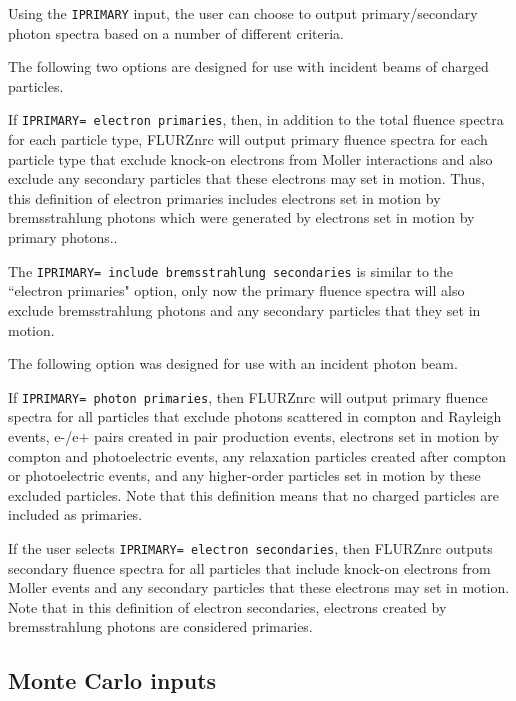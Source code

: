 \documentclass[12pt,twoside]{article}  %
\begin{document}
Using the {\tt IPRIMARY} input, the user can choose to output primary/secondary photon spectra based on a number of different criteria.

The following two options are designed for use with incident beams of
charged particles.

If {\tt IPRIMARY= electron primaries}, then, in addition to the total fluence
spectra for each particle type, FLURZnrc will output primary fluence
spectra for each particle type that exclude knock-on electrons from
Moller interactions and also exclude any secondary particles that these electrons may
set in motion.  Thus, this definition of electron primaries includes electrons
set in motion by bremsstrahlung photons which were generated by electrons
set in motion by primary photons..

The {\tt IPRIMARY= include bremsstrahlung secondaries} is similar to the
``electron primaries" option, only now the primary fluence spectra will
also exclude bremsstrahlung photons and any secondary particles that they
set in motion.

The following option was designed for use with an incident photon beam.

If {\tt IPRIMARY= photon primaries}, then FLURZnrc will output
primary fluence spectra for all particles that exclude photons scattered
in compton and Rayleigh events, e-/e+ pairs created in pair production
events, electrons set in motion by compton and photoelectric events, any
relaxation particles created after compton or photoelectric events, and
any higher-order particles set in motion by these excluded particles.
Note that this definition means that no charged particles are included as
primaries.

If the user selects {\tt IPRIMARY= electron secondaries}, then FLURZnrc outputs
secondary fluence spectra for all particles that include knock-on electrons
from Moller events and any secondary particles that these electrons may set
in motion.  Note that in this definition of electron secondaries, electrons
created by bremsstrahlung photons are considered primaries.

\subsection{Monte Carlo inputs}
\end{document}

